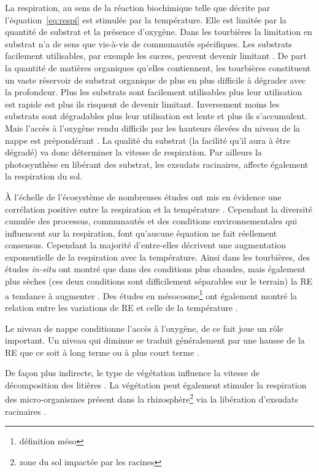 La respiration, au sens de la réaction biochimique telle que  décrite par l'équation~\ref{eq:respi} est stimulée par la température.
Elle est limitée par la quantité de substrat et la présence d'oxygène.
Dans les tourbières la limitation en substrat n'a de sens que vis-à-vis de communautés spécifiques.
Les substrats facilement utilisables, par exemple les sucres, peuvent devenir limitant \plop.
De part la quantité de matières organiques qu'elles contiennent, les tourbières constituent un vaste réservoir de substrat organique de plus en plus difficile à dégrader avec la profondeur.
Plus les substrats sont facilement utilisables plus leur utilisation est rapide est plus ils risquent de devenir limitant.
Inversement moins les substrats sont dégradables plus leur utilisation est lente et plus ils s'accumulent.
Mais l'accès à l'oxygène rendu difficile par les hauteurs élevées du niveau de la nappe est prépondérant \plop.
La qualité du substrat (la facilité qu'il aura à être dégradé) va donc déterminer la vitesse de respiration.
Par ailleurs la photosynthèse en libérant des substrat, les exsudats racinaires, affecte également la respiration du sol.

À l'échelle de l'écosystème de nombreuses études ont mis en évidence une corrélation positive entre la respiration et la température \citep{singh1977,raich1992,luo2006}.
Cependant la diversité cumulée des processus, communautés et des conditions environnementales qui influencent sur la respiration, font qu'aucune équation ne fait réellement consensus.
Cependant la majorité d'entre-elles décrivent une augmentation exponentielle de la respiration avec la température.
Ainsi dans les tourbières, des études \textit{in-situ} ont montré que dans des conditions plus chaudes, mais également plus sèches (ces deux conditions sont difficilement séparables sur le terrain) la RE a tendance à augmenter  \citep{aurela2007,cai2010,ward2013}.
Des études en mésocosme\footnote{définition méso} ont également montré la relation entre les variations de RE et celle de la température \citep{updegraff2001,weedon2013}.

Le niveau de nappe conditionne l'accès à l'oxygène, de ce fait joue un rôle important.
Un niveau qui diminue se traduit généralement par une hausse de la RE que ce soit à long terme \citep{strack2006,ballantyne2014} ou à plus court terme \citep{aerts1997}.

De façon plus indirecte, le type de végétation influence la vitesse de décomposition des litières \citep{hobbie1996,liu2000}.
La végétation peut également stimuler la respiration des micro-organismes présent dans la rhizosphère\footnote{zone du sol impactée par les racines} via la libération d'exsudats racinaires \citep{moore2002}.

